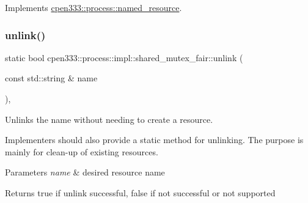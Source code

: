 Implements \hyperlink{classcpen333_1_1process_1_1named__resource_a5d33168fee48c9b0c58ab8fd96e230ce}{cpen333\+::process\+::named\+\_\+resource}.

\mbox{\label{classcpen333_1_1process_1_1impl_1_1shared__mutex__fair_a956a4efec20df5852fef56bfd2a22ea2}} 
\subsubsection{\texorpdfstring{unlink()}{unlink()}\hspace{0.1cm}{\footnotesize\ttfamily [2/2]}}
{\footnotesize\ttfamily static bool cpen333\+::process\+::impl\+::shared\+\_\+mutex\+\_\+fair\+::unlink (\begin{DoxyParamCaption}\item[{const std\+::string \&}]{name }\end{DoxyParamCaption})\hspace{0.3cm}{\ttfamily [inline]}, {\ttfamily [static]}}



Unlinks the name without needing to create a resource. 

Implementers should also provide a static method for unlinking. The purpose is mainly for clean-\/up of existing resources.


\begin{DoxyParams}{Parameters}
{\em name} & desired resource name \\
\hline
\end{DoxyParams}
\begin{DoxyReturn}{Returns}
{\ttfamily true} if unlink successful, {\ttfamily false} if not successful or not supported 
\end{DoxyReturn}
\mbox{\label{classcpen333_1_1process_1_1impl_1_1shared__mutex__fair_a52f1959d5dfe0c08b911e0c4b06ce61c}} 
